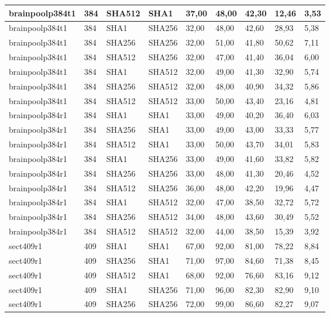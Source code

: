 \begin{longtable}{| l | l | l | l | l |l |l |l |l |}
brainpoolp384t1 & 384 & SHA512 & SHA1 & 37,00 & 48,00 & 42,30 & 12,46 & 3,53 \\ \hline 
brainpoolp384t1 & 384 & SHA1 & SHA256 & 32,00 & 48,00 & 42,60 & 28,93 & 5,38 \\ \hline 
brainpoolp384t1 & 384 & SHA256 & SHA256 & 32,00 & 51,00 & 41,80 & 50,62 & 7,11 \\ \hline 
brainpoolp384t1 & 384 & SHA512 & SHA256 & 32,00 & 47,00 & 41,40 & 36,04 & 6,00 \\ \hline 
brainpoolp384t1 & 384 & SHA1 & SHA512 & 32,00 & 49,00 & 41,30 & 32,90 & 5,74 \\ \hline 
brainpoolp384t1 & 384 & SHA256 & SHA512 & 32,00 & 48,00 & 40,90 & 34,32 & 5,86 \\ \hline 
brainpoolp384t1 & 384 & SHA512 & SHA512 & 33,00 & 50,00 & 43,40 & 23,16 & 4,81 \\ \hline 
brainpoolp384r1 & 384 & SHA1 & SHA1 & 33,00 & 49,00 & 40,20 & 36,40 & 6,03 \\ \hline 
brainpoolp384r1 & 384 & SHA256 & SHA1 & 33,00 & 49,00 & 43,00 & 33,33 & 5,77 \\ \hline 
brainpoolp384r1 & 384 & SHA512 & SHA1 & 33,00 & 50,00 & 43,70 & 34,01 & 5,83 \\ \hline 
brainpoolp384r1 & 384 & SHA1 & SHA256 & 33,00 & 49,00 & 41,60 & 33,82 & 5,82 \\ \hline 
brainpoolp384r1 & 384 & SHA256 & SHA256 & 33,00 & 48,00 & 41,30 & 20,46 & 4,52 \\ \hline 
brainpoolp384r1 & 384 & SHA512 & SHA256 & 36,00 & 48,00 & 42,20 & 19,96 & 4,47 \\ \hline 
brainpoolp384r1 & 384 & SHA1 & SHA512 & 32,00 & 47,00 & 38,50 & 32,72 & 5,72 \\ \hline 
brainpoolp384r1 & 384 & SHA256 & SHA512 & 34,00 & 48,00 & 43,60 & 30,49 & 5,52 \\ \hline 
brainpoolp384r1 & 384 & SHA512 & SHA512 & 32,00 & 44,00 & 38,50 & 15,39 & 3,92 \\ \hline 
sect409r1 & 409 & SHA1 & SHA1 & 67,00 & 92,00 & 81,00 & 78,22 & 8,84 \\ \hline 
sect409r1 & 409 & SHA256 & SHA1 & 71,00 & 97,00 & 84,60 & 71,38 & 8,45 \\ \hline 
sect409r1 & 409 & SHA512 & SHA1 & 68,00 & 92,00 & 76,60 & 83,16 & 9,12 \\ \hline 
sect409r1 & 409 & SHA1 & SHA256 & 71,00 & 96,00 & 82,30 & 82,90 & 9,10 \\ \hline 
sect409r1 & 409 & SHA256 & SHA256 & 72,00 & 99,00 & 86,60 & 82,27 & 9,07 \\ \hline 

\end{longtable}

